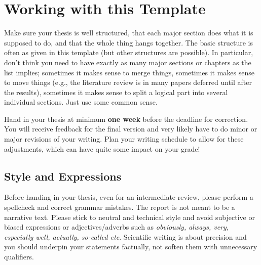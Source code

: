 \documentclass[a4paper,twoside, openright,12pt]{report}
\newenvironment{abstractpage}
  {\vspace*{\fill}\thispagestyle{empty}}
  {\vfill}%
\renewenvironment{abstract}[1]
  {\bigskip\selectlanguage{#1}%
   \begin{center}\bfseries\abstractname\end{center}}
  {\par\bigskip}
\begin{document}
\begin{abstractpage}
	\begin{abstract}{english}
	    \lipsum[1]
	\end{abstract}
	\vspace{2cm}
	\begin{abstract}{ngerman}
	    \lipsum[1]
	\end{abstract}
\end{abstractpage}

\pagestyle{fancy}

\tableofcontents 


\chapter{Working with this Template}

Make sure your thesis is well structured, that each major section does what it is supposed to do, and that the whole thing hangs together. The basic structure is often as given in this template (but other structures are possible). In particular, don't think you need to have exactly as many major sections or chapters as the list implies; sometimes it makes sense to merge things, sometimes it makes sense to move things (e.g., the literature review is in many papers deferred until after the results), sometimes it makes sense to split a logical part into several individual sections. Just use some common sense.

Hand in your thesis at minimum \textbf{one week} before the deadline for correction. You will receive feedback for the final version and very likely have to do minor or major revisions of your writing. Plan your writing schedule to allow for these adjustments, which can have quite some impact on your grade! 

\section{Style and Expressions}

Before handing in your thesis, even for an intermediate review, please perform a spellcheck and correct grammar mistakes. The report is not meant to be a narrative text. Please stick to neutral and technical style and avoid subjective or biased expressions or adjectives/adverbs such as \emph{obviously, always, very, especially well, actually, so-called etc}. Scientific writing is about precision and you should underpin your statements factually, not soften them with unnecessary qualifiers.
\end{document}
